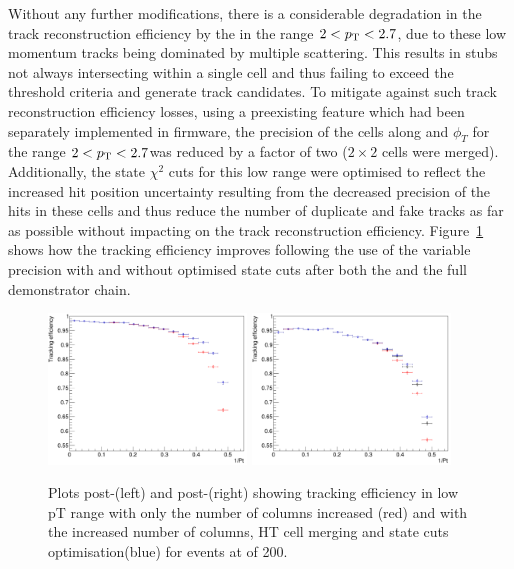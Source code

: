 Without any further modifications, there is a considerable degradation in the track reconstruction efficiency by the \HT in the range $2 < p_{\mathrm{T}} < 2.7$\GeVc, due to these low momentum tracks being dominated by multiple scattering.
This results in stubs not always intersecting within a single \HT cell and thus failing to exceed the threshold criteria and generate track candidates.
To mitigate against such track reconstruction efficiency losses, using a preexisting feature which had been separately implemented in firmware, the precision of the \HT cells along \qpt and $\phi_{T}$ for the range $2 < p_{\mathrm{T}} < 2.7$\GeVc was reduced by a factor of two (\ie $2 \times 2$ cells were merged).
Additionally, the \KF state $\chi^2$ cuts for this low \pT range were optimised to reflect the increased hit position uncertainty resulting from the decreased precision of the hits in these \HT cells and thus reduce the number of duplicate and fake tracks as far as possible without impacting on the \HT track reconstruction efficiency.
Figure~\ref{fig:2GeVFlatEff} shows how the tracking efficiency improves following the use of the variable precision \HT with and without optimised \KF state cuts after both the \HT and the full demonstrator chain. 

\begin{figure}[tbp]
\centering
\includegraphics[width=0.47\textwidth]{figs/tk-upgrade/results-lowPtTracking/htTrackingEffVsInvPtFlatGeometry_5000.pdf}
\includegraphics[width=0.47\textwidth]{figs/tk-upgrade/results-lowPtTracking/kfTrackingEffVsInvPtFlatGeometry_5000.pdf}
\caption{Plots post-\HT (left) and post-\KF (right) showing tracking efficiency in low pT range with only the number of \qpt columns increased (red) and with the increased number of columns, HT cell merging and \KF state cuts optimisation(blue) for \ttbar events at \PU of 200.
}
\label{fig:2GeVFlatEff}	
\end{figure}

